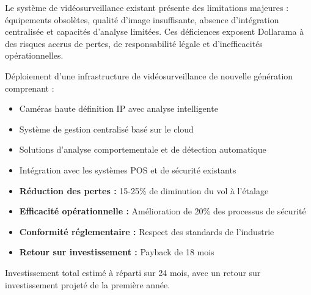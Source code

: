 \documentclass{dollarama}
\begin{document}
\begin{executivesummaryenv}

Le système de vidéosurveillance existant présente des limitations majeures : équipements obsolètes, qualité d'image insuffisante, absence d'intégration centralisée et capacités d'analyse limitées. Ces déficiences exposent Dollarama à des risques accrus de pertes, de responsabilité légale et d'inefficacités opérationnelles.

Déploiement d'une infrastructure de vidéosurveillance de nouvelle génération comprenant :
\begin{itemize}
    \item Caméras haute définition IP avec analyse intelligente
    \item Système de gestion centralisé basé sur le cloud
    \item Solutions d'analyse comportementale et de détection automatique
    \item Intégration avec les systèmes POS et de sécurité existants
\end{itemize}

\begin{itemize}
    \item \textbf{Réduction des pertes :} 15-25\% de diminution du vol à l'étalage
    \item \textbf{Efficacité opérationnelle :} Amélioration de 20\% des processus de sécurité
    \item \textbf{Conformité réglementaire :} Respect des standards de l'industrie
    \item \textbf{Retour sur investissement :} Payback de 18 mois
\end{itemize}

Investissement total estimé à  réparti sur 24 mois, avec un retour sur investissement projeté de  la première année.

\end{executivesummaryenv}

\clearpage


\end{document}
